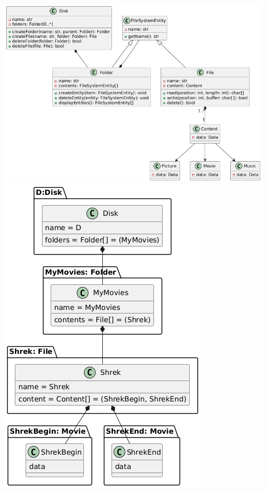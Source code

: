 \documentclass{article}
\begin{document}
\includegraphics[width=\textwidth]{6_1.png}
\includegraphics[width=\textwidth]{6_2.png}
\end{document}
